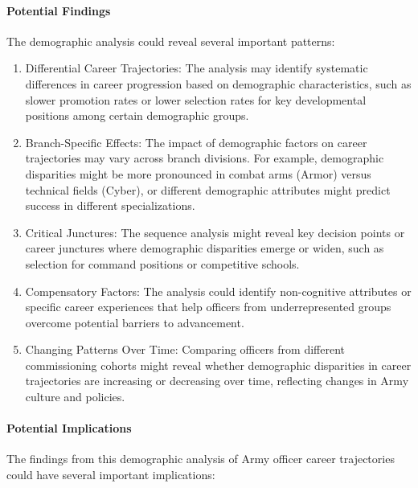 \documentclass[./main.tex]{subfiles}
\begin{document}
\paragraph{Potential Findings}\label{potential-findings}

The demographic analysis could reveal several important patterns:

\begin{enumerate}
\def\labelenumi{\arabic{enumi}.}
\item
  Differential Career Trajectories: The analysis may identify systematic
  differences in career progression based on demographic
  characteristics, such as slower promotion rates or lower selection
  rates for key developmental positions among certain demographic
  groups.
\item
  Branch-Specific Effects: The impact of demographic factors on career
  trajectories may vary across branch divisions. For example,
  demographic disparities might be more pronounced in combat arms
  (Armor) versus technical fields (Cyber), or different demographic
  attributes might predict success in different specializations.
\item
  Critical Junctures: The sequence analysis might reveal key decision
  points or career junctures where demographic disparities emerge or
  widen, such as selection for command positions or competitive schools.
\item
  Compensatory Factors: The analysis could identify non-cognitive
  attributes or specific career experiences that help officers from
  underrepresented groups overcome potential barriers to advancement.
\item
  Changing Patterns Over Time: Comparing officers from different
  commissioning cohorts might reveal whether demographic disparities in
  career trajectories are increasing or decreasing over time, reflecting
  changes in Army culture and policies.
\end{enumerate}

\paragraph{Potential Implications}\label{potential-implications}

The findings from this demographic analysis of Army officer career
trajectories could have several important implications:
\end{document}
